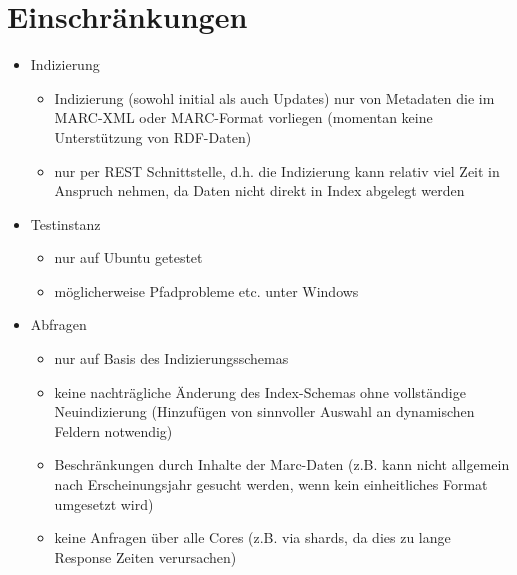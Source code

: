 \documentclass[10pt]{article}
\begin{document}


\newpage
\section{Einschränkungen}
\begin{itemize}
	\item Indizierung
	\begin{itemize}
		\item Indizierung (sowohl initial als auch Updates) nur von Metadaten die im MARC-XML oder MARC-Format vorliegen (momentan keine Unterstützung von RDF-Daten)
		\item nur per REST Schnittstelle, d.h. die Indizierung kann relativ viel Zeit in Anspruch nehmen, da Daten nicht direkt in Index abgelegt werden
	\end{itemize}
	
	
	\item Testinstanz
	\begin{itemize}
		\item nur auf Ubuntu getestet
		\item möglicherweise Pfadprobleme etc. unter Windows
	\end{itemize}
	
	\item Abfragen
	\begin{itemize}
		\item nur auf Basis des Indizierungsschemas %
		\item keine nachträgliche Änderung des Index-Schemas ohne vollständige Neuindizierung (Hinzufügen von sinnvoller Auswahl an dynamischen Feldern notwendig)
		\item Beschränkungen durch Inhalte der Marc-Daten (z.B. kann nicht allgemein nach Erscheinungsjahr gesucht werden, wenn kein einheitliches Format umgesetzt wird)
		\item keine Anfragen über alle Cores (z.B. via shards, da dies zu lange Response Zeiten verursachen)
		
	\end{itemize}
\end{itemize}
\end{document}
